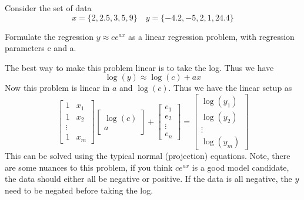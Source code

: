 \documentclass{homework}
\begin{document}
\begin{problem}[3-3]
  Consider the set of data
  \[ x = \{2,2.5,3,5,9\} \quad y = \{-4.2,-5,2,1,24.4\} \]
\end{problem}

\begin{solution}

   

\end{solution}

\begin{problem}[3-6]
  Formulate the regression $y \approx ce^{ax}$ as a linear regression problem, with regression parameters c and a. 
\end{problem}

\begin{solution}
  The best way to make this problem linear is to take the log. Thus we have
  \[\log(y) \approx \log(c) + ax\]
  Now this problem is linear in $a$ and $\log(c)$.
  Thus we have the linear setup as
  $$
  \begin{bmatrix}
    1 & x_1 \\
    1 & x_2 \\
    \vdots \\
    1 & x_m
  \end{bmatrix}
  \begin{bmatrix}
    \log(c) \\
    a 
  \end{bmatrix}
  +
  \begin{bmatrix}
   e_1 \\
   e_2 \\
   \vdots \\
   e_n
  \end{bmatrix}
  =
  \begin{bmatrix}
    \log(y_1) \\
    \log(y_2) \\
    \vdots \\
    \log(y_m)
  \end{bmatrix}
  $$
  This can be solved using the typical normal (projection) equations. Note, there are some nuances to this problem, if you think $ce^{ax}$ is a good model candidate, the data should either all be negative or positive. If the data is all negative, the $y$ need to be negated before taking the log.
\end{solution}
\end{document}
